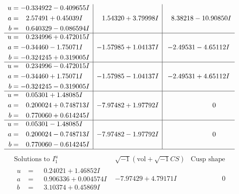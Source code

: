 \documentclass[1p]{elsarticle_modified}
\theoremstyle{definition}
\newcommand{\I}{\sqrt{-1}}
\begin{document}
$$\begin{array}{c|c|c}
\begin{aligned}
u &= -0.334922 - 0.409655 I \\
a &= \phantom{-}2.57491 + 0.45039 I \\
b &= \phantom{-}0.640329 - 0.086594 I\end{aligned}
 & \phantom{-}1.54320 + 3.79998 I & \phantom{-}8.38218 - 10.90850 I \\ \hline\begin{aligned}
u &= \phantom{-}0.234996 + 0.472015 I \\
a &= -0.34460 - 1.75071 I \\
b &= -0.324245 + 0.319005 I\end{aligned}
 & -1.57985 + 1.04137 I & -2.49531 - 4.65112 I \\ \hline\begin{aligned}
u &= \phantom{-}0.234996 - 0.472015 I \\
a &= -0.34460 + 1.75071 I \\
b &= -0.324245 - 0.319005 I\end{aligned}
 & -1.57985 - 1.04137 I & -2.49531 + 4.65112 I \\ \hline\begin{aligned}
u &= \phantom{-}0.05301 + 1.48085 I \\
a &= \phantom{-}0.200024 + 0.748713 I \\
b &= \phantom{-}0.770060 + 0.614245 I\end{aligned}
 & -7.97482 + 1.97792 I & \phantom{-0.000000 } 0 \\ \hline\begin{aligned}
u &= \phantom{-}0.05301 - 1.48085 I \\
a &= \phantom{-}0.200024 - 0.748713 I \\
b &= \phantom{-}0.770060 - 0.614245 I\end{aligned}
 & -7.97482 - 1.97792 I & \phantom{-0.000000 } 0\\
 \hline 
 \end{array}$$\newpage$$\begin{array}{c|c|c}  
\text{Solutions to }I^u_{1}& \I (\text{vol} + \sqrt{-1}CS) & \text{Cusp shape}\\
 \hline 
\begin{aligned}
u &= \phantom{-}0.24021 + 1.46852 I \\
a &= \phantom{-}0.906336 + 0.004574 I \\
b &= \phantom{-}3.10374 + 0.45869 I\end{aligned}
 & -7.97429 + 4.79171 I & \phantom{-0.000000 } 0 \\ \hline\begin{aligned}

\end{aligned}
\end{array}$$
\end{document}
